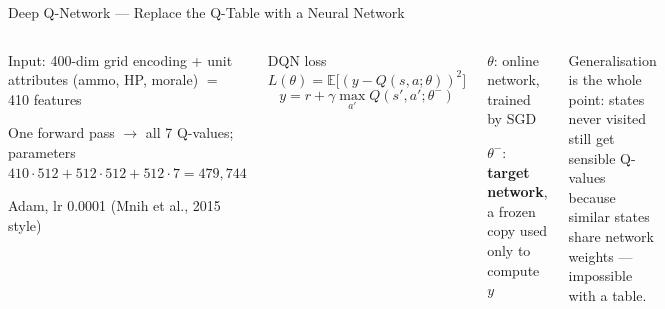\documentclass[aspectratio=169,10pt,t]{beamer}
\begin{document}
\begin{frame}{Deep Q-Network --- Replace the Q-Table with a Neural Network}
\begin{columns}[T]
\begin{tl}\item Input: 400-dim grid encoding + unit attributes (ammo, HP, morale) $=$ 410 features\item One forward pass $\to$ all 7 Q-values; parameters $410\cdot512+512\cdot512+512\cdot7=479{,}744$\item Adam, lr 0.0001 (Mnih et al., 2015 style)\end{tl}
\begin{fbx}{DQN loss}\[L(\theta)=\mathbb{E}\big[(y-Q(s,a;\theta))^{2}\big]\]\[y=r+\gamma\max_{a'}Q(s',a';\theta^{-})\]\end{fbx}
\begin{tl}\item $\theta$: online network, trained by SGD\item $\theta^{-}$: \textbf{target network}, a frozen copy used only to compute $y$\end{tl}
\begin{ibox}\scriptsize Generalisation is the whole point: states never visited still get sensible Q-values because similar states share network weights --- impossible with a table.\end{ibox}
\end{columns}
\end{frame}
\end{document}
